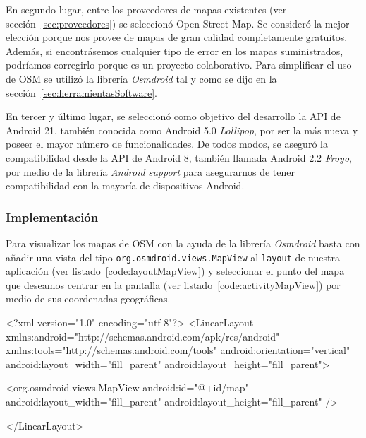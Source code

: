 En segundo lugar, entre los proveedores de mapas existentes (ver sección~\ref{sec:proveedores}) se
seleccionó Open Street Map. Se consideró la mejor elección porque nos provee de mapas de gran
calidad completamente gratuitos. Además, si encontrásemos cualquier tipo de error en los mapas
suministrados, podríamos corregirlo porque es un proyecto colaborativo. Para simplificar el uso de
\acs{OSM} se utilizó la librería \emph{Osmdroid} tal y como se dijo en la
sección~\ref{sec:herramientasSoftware}.

En tercer y último lugar, se seleccionó como objetivo del desarrollo la \acs{API} de Android 21,
también conocida como Android 5.0 \emph{Lollipop}, por ser la más nueva y poseer el mayor número de
funcionalidades. De todos modos, se aseguró la compatibilidad desde la \acs{API} de Android 8,
también llamada Android 2.2 \emph{Froyo}, por medio de la librería \emph{Android support} para
asegurarnos de tener compatibilidad con la mayoría de dispositivos Android.

\subsubsection{Implementación}

Para visualizar los mapas de \acs{OSM} con la ayuda de la librería \emph{Osmdroid} basta con añadir
una vista del tipo \texttt{org.osmdroid.views.MapView} al \texttt{layout} de nuestra aplicación (ver
listado~\ref{code:layoutMapView}) y seleccionar el punto del mapa que deseamos centrar en la
pantalla (ver listado~\ref{code:activityMapView}) por medio de sus coordenadas geográficas.

\begin{listing}[
  float=ht,
  language = xml,
  caption  = {Ejemplo de \texttt{layout} usando \texttt{org.osmdroid.views.MapView}},
  label    = code:layoutMapView]
<?xml version="1.0" encoding="utf-8"?>
<LinearLayout xmlns:android="http://schemas.android.com/apk/res/android"
        xmlns:tools="http://schemas.android.com/tools"
        android:orientation="vertical" 
        android:layout_width="fill_parent"
        android:layout_height="fill_parent">
        
        <org.osmdroid.views.MapView android:id="@+id/map"
                android:layout_width="fill_parent" 
                android:layout_height="fill_parent" />
                
</LinearLayout>
\end{listing}

